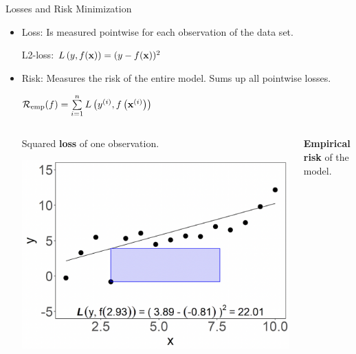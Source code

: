\documentclass[11pt,compress,t,notes=noshow, xcolor=table]{beamer}
\begin{document}
\begin{vbframe}{Losses and Risk Minimization}

\begin{itemize}
\item Loss: Is measured pointwise for each observation of the data set. 
\begin{center}
L2-loss: $L\left(y, f(\mathbf{x})\right) = (y - f(\mathbf{x}))^2$
\end{center}
\item Risk: Measures the risk of the entire model. Sums up all pointwise losses.
\begin{center}
$ \mathcal{R}_{\text{emp}}(f) = \sum\limits_{i=1}^n L\left(y^{(i)}, f\left(\mathbf{x}^{(i)}\right)\right) $
\end{center} 
\hspace{1cm}


\begin{columns}  
\begin{column}{0.4\textwidth} 
\small Squared \textbf{loss} of one observation.

  \begin{center}
    \includegraphics[width=\textwidth]{slides/ml-basics/figure_man/nutshell_ml_basic_1_loss_sqrd.png} 
  \end{center}
\end{column}  


\begin{column}{0.5\textwidth} 
\small \textbf{Empirical risk} of the model.


\end{column}
\end{columns}
\end{itemize}
\end{vbframe}
\end{document}
